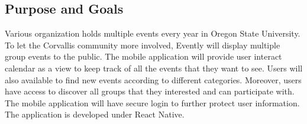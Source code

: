 \documentclass[letterpaper, 10pt,titlepage]{article}
\begin{document}
\subsection{Purpose and Goals}
Various organization holds multiple events every year in Oregon State University. To let the Corvallis community more involved, Evently will display multiple group events to the public. The mobile application will provide user interact calendar as a view to keep track of all the events that they want to see. Users will also available to find new events according to different categories. Moreover, users have access to discover all groups that they interested and can participate with. The mobile application will have secure login to further protect user information. The application is developed under React Native. \\ \\
\end{document}
